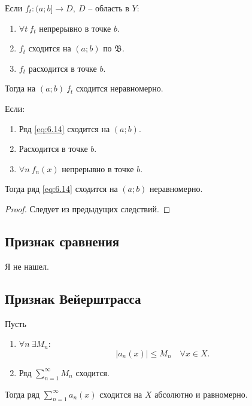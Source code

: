 \begin{corollary}
    Если $f_t:(a;b] \rightarrow D, \ D$ -- область в $Y$:
    \begin{enumerate}
        \item $\forall t \ f_t$ непрерывно в точке $b$.
        \item $f_t$ сходится на $(a;b)$ по $\mathfrak{B}$.
        \item $f_t$ расходится в точке $b$.
    \end{enumerate}

    Тогда на $(a;b) \ f_t$ сходится неравномерно.
\end{corollary}

\begin{corollary}
    Если:
    \begin{enumerate}
        \item Ряд \ref{eq:6.14} сходится на $(a;b)$.
        \item Расходится в точке $b$.
        \item $\forall n \ f_n(x)$ непрерывно в точке $b$.
    \end{enumerate}

    Тогда ряд \ref{eq:6.14} сходится на $(a;b)$ неравномерно.
\end{corollary}

\begin{proof}
    Следует из предыдущих следствий.
\end{proof}

\subsection{Признак сравнения}

Я не нашел.

\subsection{Признак Вейерштрасса}

\begin{corollary}
    Пусть
    \begin{enumerate}
        \item $\forall n \ \exists M_n$:
              \[
                  \big|a_n(x)\big| \leqslant M_n \quad \forall x \in X.
              \]
        \item Ряд $\sum_{n=1}^{\infty} M_n$ сходится.
    \end{enumerate}

    Тогда ряд $\sum_{n=1}^{\infty}a_n(x)$ сходится на $X$ абсолютно и равномерно.
\end{corollary}

